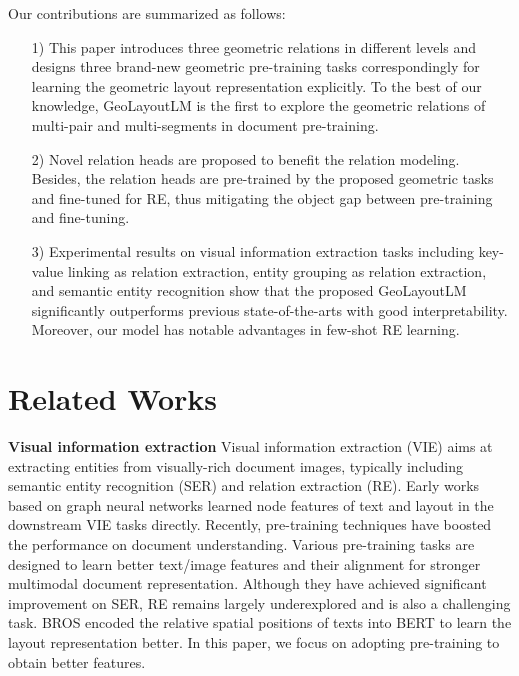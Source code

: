 \documentclass[10pt,twocolumn,letterpaper]{article}
\begin{document}
Our contributions are summarized as follows:

\begin{itemize} \setlength{\itemsep}{0pt}
  \item[1)]  This paper introduces three geometric relations in different levels and designs three brand-new geometric pre-training tasks correspondingly for learning the geometric layout representation explicitly.  To the best of our knowledge, GeoLayoutLM is the first to explore the geometric relations of multi-pair and multi-segments in document pre-training.
  \item[2)]  Novel relation heads are proposed to benefit the relation modeling. Besides, the relation heads are pre-trained by the proposed geometric tasks and fine-tuned for RE, thus mitigating the object gap between pre-training and fine-tuning.
\item[3)]  Experimental results on visual information extraction tasks including key-value linking as relation extraction, entity grouping as relation extraction, and semantic entity recognition show that the proposed GeoLayoutLM significantly outperforms previous state-of-the-arts with good interpretability. Moreover, our model has notable advantages in few-shot RE learning.
\end{itemize}









\section{Related Works}
\noindent\textbf{Visual information extraction}
Visual information extraction (VIE) aims at extracting entities from visually-rich document images, typically including semantic entity recognition (SER) and relation extraction (RE)\cite{jaume2019funsd,xu2022xfund,li2021structext,hong2022bros}.
Early works based on graph neural networks \cite{kipf2016semi,qian2018graphie,liu2019graph,qian2019graphie,luo2020merge,tang2021matchvie,yu2021pick} learned node features of text and layout in the downstream VIE tasks directly.
Recently, pre-training techniques have boosted the performance on document understanding. Various pre-training tasks are designed to learn better text/image features and their alignment for stronger multimodal document representation\cite{li2021structext,li2021selfdoc,appalaraju2021docformer,gu2022unified,wang2022lilt,gu2022xylayoutlm,lin2021vibertgrid,luo2022bivldoc,xu2020layoutlm,xu2021layoutxlm,xu2020layoutlmv2,huang2022layoutlmv3}.
Although they have achieved significant improvement on SER, RE remains largely underexplored and is also a challenging task\cite{zhang2021entity,hwang2020spatial,hong2022bros,li2021structext}.
BROS\cite{hong2022bros} encoded the relative spatial positions of texts into BERT\cite{devlin2018bert} to learn the layout representation better. In this paper, we focus on adopting pre-training to obtain better features.
\end{document}
